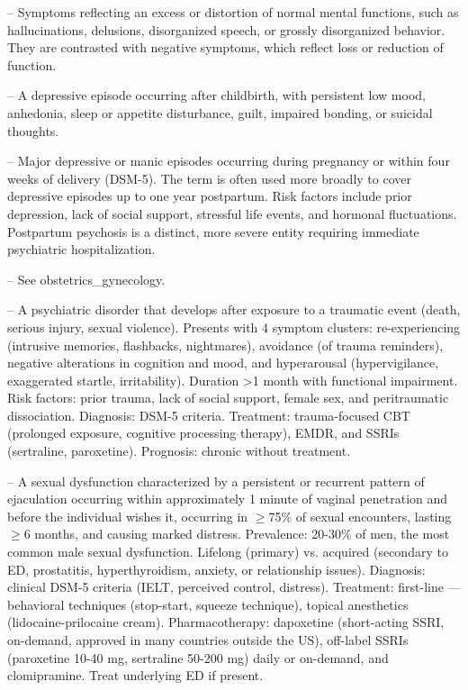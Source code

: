 -- Symptoms reflecting an excess or distortion of normal mental functions, such as hallucinations, delusions, disorganized speech, or grossly disorganized behavior. They are contrasted with negative symptoms, which reflect loss or reduction of function.

-- A depressive episode occurring after childbirth, with persistent low mood, anhedonia, sleep or appetite disturbance, guilt, impaired bonding, or suicidal thoughts.

-- Major depressive or manic episodes occurring during pregnancy or within four weeks of delivery (DSM-5). The term is often used more broadly to cover depressive episodes up to one year postpartum. Risk factors include prior depression, lack of social support, stressful life events, and hormonal fluctuations. Postpartum psychosis is a distinct, more severe entity requiring immediate psychiatric hospitalization.

-- See obstetrics\_gynecology.

-- A psychiatric disorder that develops after exposure to a traumatic event (death, serious injury, sexual violence). Presents with 4 symptom clusters: re-experiencing (intrusive memories, flashbacks, nightmares), avoidance (of trauma reminders), negative alterations in cognition and mood, and hyperarousal (hypervigilance, exaggerated startle, irritability). Duration >1 month with functional impairment. Risk factors: prior trauma, lack of social support, female sex, and peritraumatic dissociation. Diagnosis: DSM-5 criteria. Treatment: trauma-focused CBT (prolonged exposure, cognitive processing therapy), EMDR, and SSRIs (sertraline, paroxetine). Prognosis: chronic without treatment.

-- A sexual dysfunction characterized by a persistent or recurrent pattern of ejaculation occurring within approximately 1 minute of vaginal penetration and before the individual wishes it, occurring in \(\ge\)75\% of sexual encounters, lasting \(\ge\)6 months, and causing marked distress. Prevalence: 20-30\% of men, the most common male sexual dysfunction. Lifelong (primary) vs. acquired (secondary to ED, prostatitis, hyperthyroidism, anxiety, or relationship issues). Diagnosis: clinical DSM-5 criteria (IELT, perceived control, distress). Treatment: first-line — behavioral techniques (stop-start, squeeze technique), topical anesthetics (lidocaine-prilocaine cream). Pharmacotherapy: dapoxetine (short-acting SSRI, on-demand, approved in many countries outside the US), off-label SSRIs (paroxetine 10-40 mg, sertraline 50-200 mg) daily or on-demand, and clomipramine. Treat underlying ED if present.

